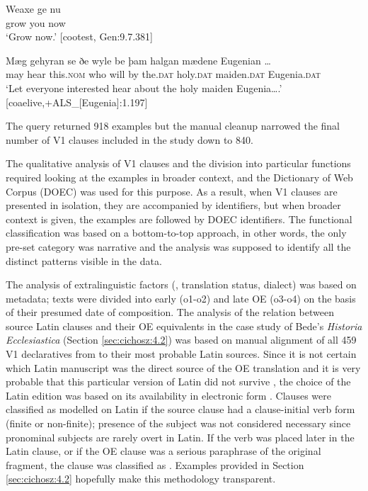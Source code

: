 \documentclass[output=paper,colorlinks,citecolor=brown]{langscibook}
\begin{document}
\ea%
\label{ex:cichosz:5}
\gll Weaxe   ge   nu \\
grow  you  now \\
\glt‘Grow now.' \hfill [cootest, Gen:9.7.381]
\z 

\ea%
\label{ex:cichosz:6}
\gll  Mæg   gehyran   se     ðe   wyle   be   þam     halgan mædene   Eugenian … \\
may  hear    this.\textsc{nom}  who  will  by  the.\textsc{dat}  holy.\textsc{dat} maiden.\textsc{dat}  Eugenia.\textsc{dat} \\
\glt‘Let everyone interested hear about the holy maiden Eugenia….'\\ \hfill [coaelive,+ALS\_[Eugenia]:1.197]
\z 

The query returned 918 examples but the manual cleanup narrowed the final number of V1 clauses included in the study down to 840.

The qualitative analysis of V1 clauses and the division into particular functions required looking at the examples in broader context, and the Dictionary of  Web Corpus (DOEC) was used for this purpose. As a result, when V1 clauses are presented in isolation, they are accompanied by  identifiers, but when broader context is given, the examples are followed by DOEC identifiers. The functional classification was based on a bottom-to-top approach, in other words, the only pre-set category was narrative and the analysis was supposed to identify all the distinct patterns visible in the data.  

The analysis of extralinguistic factors (, translation status, dialect) was based on  metadata; texts were divided into early (o1-o2) and late OE (o3-o4) on the basis of their presumed date of composition.
\largerpage
The analysis of the relation between source Latin clauses and their OE equivalents in the case study of Bede's \textit{Historia Ecclesiastica} (Section \ref{sec:cichosz:4.2}) was based on manual alignment of all 459 V1 declaratives from  to their most probable Latin sources. Since it is not certain which Latin manuscript was the direct source of the OE translation \citep[43]{Lemke2015} and it is very probable that this particular version of Latin  did not survive \citep{Wallis2013}, the choice of the Latin edition was based on its availability in electronic form \citep{Plummer1896}. Clauses were classified as  modelled on Latin if the source clause had a clause-initial verb form (finite or non-finite); presence of the subject was not considered necessary since pronominal subjects are rarely overt in Latin. If the verb was placed later in the Latin clause, or if the OE clause was a serious paraphrase of the original fragment, the clause was classified as . Examples provided in Section \ref{sec:cichosz:4.2} hopefully make this methodology transparent.
\end{document}
